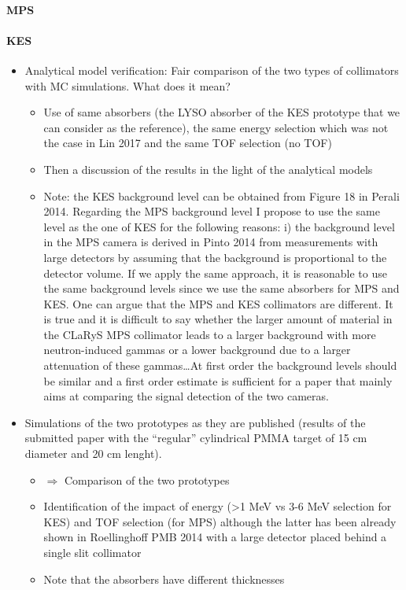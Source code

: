 \documentclass[a4paper,english]{article}
\begin{document}
\paragraph{MPS}

\paragraph{KES}

\begin{itemize}
  \item Analytical model verification: Fair comparison of the two types of collimators with MC simulations. What does it mean? 
  \begin{itemize}
    \item Use of same absorbers (the LYSO absorber of the KES prototype that we can consider as the reference), the same energy selection which was not the case in Lin 2017 and the same TOF selection (no TOF)
    \item Then a discussion of the results in the light of the analytical models
    \item Note: the KES background level can be obtained from Figure 18 in Perali 2014. Regarding the MPS background level I propose to use the same level as the one of KES for the following reasons: i) the background level in the MPS camera is derived in Pinto 2014 from measurements with large detectors by assuming that the background is proportional to the detector volume. If we apply the same approach, it is reasonable to use the same background levels since we use the same absorbers for MPS and KES. One can argue that the MPS and KES collimators are different. It is true and it is difficult to say whether the larger amount of material in the CLaRyS MPS collimator leads to a larger background with more neutron-induced gammas or a lower background due to a larger attenuation of these gammas\dots At first order the background levels should be similar and a first order estimate is sufficient for a paper that mainly aims at comparing the signal detection of the two cameras.
  \end{itemize}    
  \item Simulations of the two prototypes as they are published (results of the submitted paper with the \enquote{regular} cylindrical PMMA target of 15 cm diameter and 20 cm lenght). 
  \begin{itemize}
    \item $\Rightarrow$ Comparison of the two prototypes
    \item Identification of the impact of energy (>1 MeV vs 3-6 MeV selection for KES) and TOF selection (for MPS) although the latter has been already shown in Roellinghoff PMB 2014 with a large detector placed behind a single slit collimator
    \item Note that the absorbers have different thicknesses
  \end{itemize}     
\end{itemize}
\end{document}
